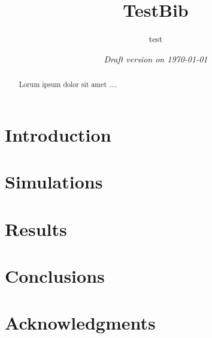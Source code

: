 \documentclass[usenatbib, useAMS,usegraphicx]{mn2e}
\title[]{TestBib}
\author[]{test}
\begin{document}
\date{{\it Draft version on \today}}
\pagerange{\pageref{firstpage}--\pageref{lastpage}} \pubyear{----}
\maketitle

\label{firstpage}

\begin{abstract}
Lorum ipsum dolor sit amet ....
\end{abstract}

\begin{keywords}

\end{keywords}


\section{Introduction} %

\cite{Pichardo2012}
\cite{Martinez-Barbosa2014}

\section{Simulations}\label{sec:sim}


\section{Results}\label{sec:results}


\section{Conclusions}\label{sec:conclusions}



\section*{Acknowledgments}






\label{lastpage}
\end{document}
